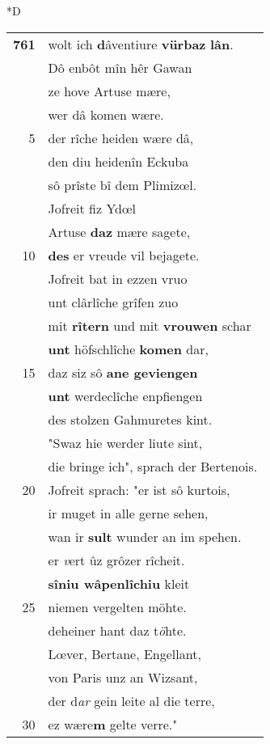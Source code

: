 \documentclass[8pt,a4paper,notitlepage]{article}
\begin{document}
\begin{table}[ht]
\begin{minipage}[t]{0.5\linewidth}
\small
\begin{center}*D
\end{center}
\begin{tabular}{rl}
\textbf{761} & wolt ich \textbf{d}âventiure \textbf{vürbaz} \textbf{lân}.\\ 
 & Dô enbôt mîn hêr Gawan\\ 
 & ze hove Artuse mære,\\ 
 & wer dâ komen wære.\\ 
5 & der rîche heiden wære dâ,\\ 
 & den diu heidenîn Eckuba\\ 
 & sô prîste bî dem Plimizœl.\\ 
 & Jofreit fiz Ydœl\\ 
 & Artuse \textbf{daz} mære sagete,\\ 
10 & \textbf{des} er vreude vil bejagete.\\ 
 & Jofreit bat in ezzen vruo\\ 
 & unt clârlîche grîfen zuo\\ 
 & mit \textbf{rîtern} und mit \textbf{vrouwen} schar\\ 
 & \textbf{unt} höfschlîche \textbf{komen} dar,\\ 
15 & daz siz sô \textbf{ane geviengen}\\ 
 & \textbf{unt} werdeclîche enpfiengen\\ 
 & des stolzen Gahmuretes kint.\\ 
 & "Swaz hie werder liute sint,\\ 
 & die bringe ich", sprach der Bertenois.\\ 
20 & Jofreit sprach: "er ist sô kurtois,\\ 
 & ir muget in alle gerne sehen,\\ 
 & wan ir \textbf{sult} wunder an im spehen.\\ 
 & er \textit{v}ert ûz grôzer rîcheit.\\ 
 & \textbf{sîniu wâpenlîchiu} kleit\\ 
25 & niemen vergelten möhte.\\ 
 & deheiner hant daz t\textit{ö}hte.\\ 
 & Lœver, Bertane, Engellant,\\ 
 & von Paris unz an Wizsant,\\ 
 & der d\textit{ar} gein leite al die terre,\\ 
30 & ez wære\textbf{m} gelte verre."\\ 

\end{tabular}
\end{minipage}
\end{table}
\end{document}
